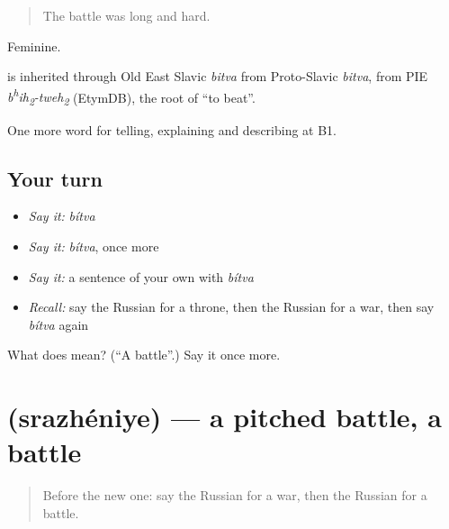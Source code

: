 \begin{quote}
The battle was long and hard.
\end{quote}

Feminine.

\begin{cousinweb}
\emph{} is inherited through Old East Slavic \emph{bitva} from Proto-Slavic \emph{bitva}, from PIE \emph{b\textsuperscript{h}ih\textsubscript{2}-tweh\textsubscript{2}} (EtymDB), the root of \emph{} \textquotedblleft{}to beat\textquotedblright{}.
\end{cousinweb}

\begin{grammarlens}[title={What you've built}]
One more word for telling, explaining and describing at B1.
\end{grammarlens}

\subsection*{Your turn}
\begin{itemize}
\raggedright
  \item \emph{Say it:} \emph{bítva}
  \item \emph{Say it:} \emph{bítva}, once more
  \item \emph{Say it:} a sentence of your own with \emph{bítva}
  \item \emph{Recall:} say the Russian for a throne, then the Russian for a war, then say \emph{bítva} again
\end{itemize}

\begin{tcolorbox}[breakable,colback=teal!4,colframe=teal!35!black,title={Before you move on}]
What does  mean? (\textquotedblleft{}A battle\textquotedblright{}.) Say it once more.
\end{tcolorbox}
\section[\texorpdfstring{\ru{сражение} (srazhéniye)}{сражение (srazhéniye)}]{ (srazhéniye) — a pitched battle, a battle}

\label{lesson:RU-C323-srazheniye}



\begin{quote}
Before the new one: say the Russian for a war, then the Russian for a battle.
\end{quote}

